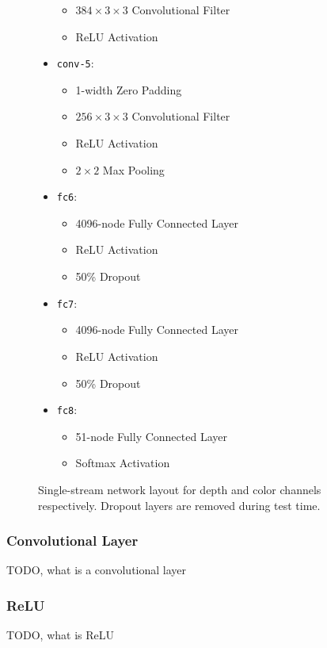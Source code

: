 \begin{figure}[htbp]
\begin{mdframed}
\begin{itemize}
\begin{itemize}
				\item $384 \times 3 \times 3$ Convolutional Filter
				\item ReLU Activation
			\end{itemize}
			\item \texttt{conv-5}:
			\begin{itemize}
				\item 1-width Zero Padding
				\item $256 \times 3 \times 3$ Convolutional Filter
				\item ReLU Activation
				\item $2 \times 2$ Max Pooling
			\end{itemize}
			\item \texttt{fc6}:
			\begin{itemize}
				\item 4096-node Fully Connected Layer
				\item ReLU Activation
				\item 50\% Dropout
			\end{itemize}
			\item \texttt{fc7}:
			\begin{itemize}
				\item 4096-node Fully Connected Layer
				\item ReLU Activation
				\item 50\% Dropout
			\end{itemize}
			\item \texttt{fc8}:
			\begin{itemize}
				\item 51-node Fully Connected Layer
				\item Softmax Activation
			\end{itemize}
		\end{itemize}
	\end{mdframed}
	\caption{Single-stream network layout for depth and color channels respectively. Dropout layers are removed during test time.}
	\label{fig:single_stream_layout}
\end{figure}

\subsubsection{Convolutional Layer}
TODO, what is a convolutional layer

\subsubsection{ReLU}
TODO, what is ReLU

